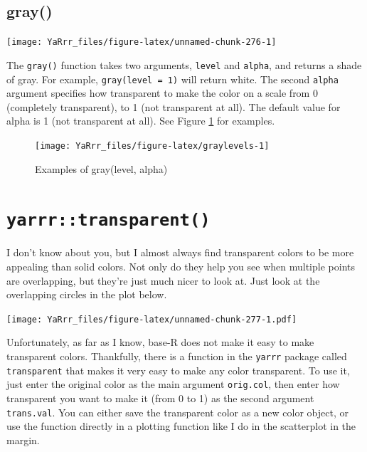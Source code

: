 \documentclass[]{book}
\theoremstyle{definition}
\theoremstyle{definition}
\theoremstyle{remark}
\begin{document}
\subsection{gray()}\label{gray}

\begin{center}\texttt{[image: YaRrr\_files/figure-latex/unnamed-chunk-276-1]} \end{center}

The \texttt{gray()} function takes two arguments, \texttt{level} and
\texttt{alpha}, and returns a shade of gray. For example,
\texttt{gray(level\ =\ 1)} will return white. The second \texttt{alpha}
argument specifies how transparent to make the color on a scale from 0
(completely transparent), to 1 (not transparent at all). The default
value for alpha is 1 (not transparent at all). See Figure
\ref{fig:graylevels} for examples.

\begin{figure}

{\centering \texttt{[image: YaRrr\_files/figure-latex/graylevels-1]} 

}

\caption{Examples of gray(level, alpha)}\label{fig:graylevels}
\end{figure}

\section{\texorpdfstring{\texttt{yarrr::transparent()}}{yarrr::transparent()}}\label{yarrrtransparent}

I don't know about you, but I almost always find transparent colors to
be more appealing than solid colors. Not only do they help you see when
multiple points are overlapping, but they're just much nicer to look at.
Just look at the overlapping circles in the plot below.

\texttt{[image: YaRrr\_files/figure-latex/unnamed-chunk-277-1.pdf]}

Unfortunately, as far as I know, base-R does not make it easy to make
transparent colors. Thankfully, there is a function in the
\texttt{yarrr} package called \texttt{transparent} that makes it very
easy to make any color transparent. To use it, just enter the original
color as the main argument \texttt{orig.col}, then enter how transparent
you want to make it (from 0 to 1) as the second argument
\texttt{trans.val}. You can either save the transparent color as a new
color object, or use the function directly in a plotting function like I
do in the scatterplot in the margin.
\end{document}

